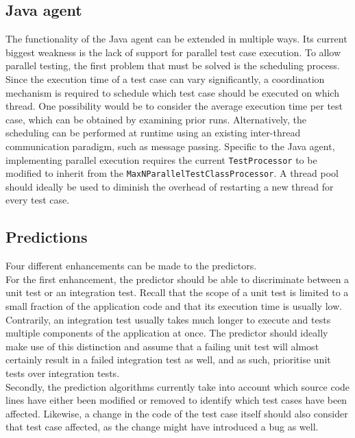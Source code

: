 \subsection{Java agent}
The functionality of the Java agent can be extended in multiple ways. Its current biggest weakness is the lack of support for parallel test case execution. To allow parallel testing, the first problem that must be solved is the scheduling process. Since the execution time of a test case can vary significantly, a coordination mechanism is required to schedule which test case should be executed on which thread. One possibility would be to consider the average execution time per test case, which can be obtained by examining prior runs. Alternatively, the scheduling can be performed at runtime using an existing inter-thread communication paradigm, such as message passing. Specific to the Java agent, implementing parallel execution requires the current \texttt{TestProcessor} to be modified to inherit from the \texttt{MaxNParallelTestClassProcessor}. A thread pool should ideally be used to diminish the overhead of restarting a new thread for every test case.

\subsection{Predictions}
Four different enhancements can be made to the predictors.\\

\noindent For the first enhancement, the predictor should be able to discriminate between a unit test or an integration test. Recall that the scope of a unit test is limited to a small fraction of the application code and that its execution time is usually low. Contrarily, an integration test usually takes much longer to execute and tests multiple components of the application at once. The predictor should ideally make use of this distinction and assume that a failing unit test will almost certainly result in a failed integration test as well, and as such, prioritise unit tests over integration tests.\\

\noindent Secondly, the prediction algorithms currently take into account which source code lines have either been modified or removed to identify which test cases have been affected. Likewise, a change in the code of the test case itself should also consider that test case affected, as the change might have introduced a bug as well.\\

